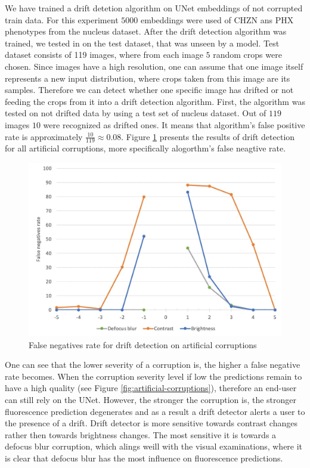 We have trained a drift detetion algorithm on UNet embeddings of not corrupted train data. For this experiment $5000$ embeddings were used of CHZN ans PHX phenotypes from the nucleus dataset. After the drift detection algorithm was trained, we tested in on the test dataset, that was unseen by a model. Test dataset consists of 119 images, where from each image $5$ random crops were chosen. Since images have a high resolution, one can assume that one image itself represents a new input distribution, where crops taken from this image are its samples. Therefore we can detect whether one specific image has drifted or not feeding the crops from it into a drift detection algorithm. First, the algorithm was tested on not drifted data by using a test set of nucleus dataset. Out of $119$ images $10$ were recognized as drifted ones. It means that algorithm's false positive rate is approximately $\frac{10}{119} \approx 0.08$. Figure \ref{fig:fn-rate} presents the results of drift detection for all artificial corruptions, more specifically alogorthm's false neagtive rate.
\begin{figure}[H]
	\begin{center}
		\includegraphics[width=0.5\linewidth]{bilder/drift-detection/fn-rate.jpg}
		\caption{False negatives rate for drift detection on artificial corruptions}\label{fig:fn-rate}
	\end{center}
\end{figure}
One can see that the lower severity of a corruption is, the higher a false negative rate becomes. When the corruption severity level if low the predictions remain to have a high quality (see Figure \ref{fig:artificial-corruptions}), therefore an end-user can still rely on the UNet. However, the stronger the corruption is, the stronger fluorescence prediction degenerates and as a result a drift detector alerts a user to the presence of a drift. Drift detector is more sensitive towards contrast changes rather then towards brightness changes. The most sensitive it is towards a defocus blur corruption, which alings weill with the visual examinations, where it is clear that defocus blur has the most influence on fluorescence predictions.